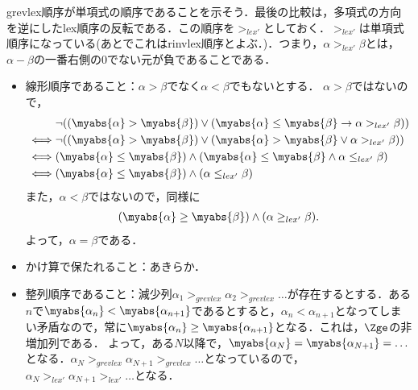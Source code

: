 grevlex順序が単項式の順序であることを示そう．最後の比較は，多項式の方向を逆にしたlex順序の反転である．この順序を$>_{lex'}$としておく．$>_{lex'}$は単項式順序になっている(あとでこれはrinvlex順序とよぶ．)．つまり，$\alpha >_{lex'} \beta$とは，$\alpha-\beta$の一番右側の0でない元が負であることである．
\begin{myproof}
 \begin{itemize}
  \item 線形順序であること：$\alpha > \beta$でなく$\alpha < \beta$でもないとする．
$\alpha > \beta$ではないので，
\begin{align}
& \neg((\myabs{\alpha} > \myabs{\beta}) \lor (\myabs{\alpha}\le \myabs{\beta} \rightarrow \alpha >_{lex'} \beta))\\
 \iff&
 \neg((\myabs{\alpha} > \myabs{\beta}) \lor (\myabs{\alpha}> \myabs{\beta} \lor \alpha >_{lex'} \beta))\\
\iff &
 (\myabs{\alpha} \le \myabs{\beta}) \land (\myabs{\alpha}\le \myabs{\beta} \land \alpha \le_{lex'} \beta)\\
 \iff&
(\myabs{\alpha} \le \myabs{\beta}) \land (\alpha \le_{lex'} \beta)
\end{align}
また，$\alpha < \beta$ではないので，同様に
\begin{align}
 (\myabs{\alpha}\ge \myabs{\beta}) \land (\alpha \ge_{lex'} \beta).
\end{align}
よって，$\alpha = \beta$である．
  \item かけ算で保たれること：あきらか．
  \item 整列順序であること：減少列$\alpha_1 >_{grevlex} \alpha_2 >_{grevlex} \dots$が存在するとする．ある$n$で$\myabs{\alpha_n} < \myabs{\alpha_{n+1}}$であるとすると，$\alpha_n < \alpha_{n+1}$となってしまい矛盾なので，常に$\myabs{\alpha_n} \ge \myabs{\alpha_{n+1}}$となる．これは，$\Zge$の非増加列である．
よって，ある$N$以降で，$\myabs{\alpha_N} = \myabs{\alpha_{N+1}} = \dots $となる．$\alpha_N >_{grevlex} \alpha_{N+1}>_{grevlex} \dots$となっているので，$\alpha_N >_{lex'} \alpha_{N+1} >_{lex'}\dots$となる．
 \end{itemize}
\end{myproof}

